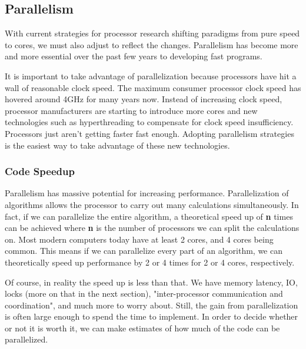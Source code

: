 \documentclass[letterpaper, 12pt]{article}
\begin{document}
\newpage

\subsection{Parallelism}
With current strategies for processor research shifting paradigms from pure speed to cores, 
we must also adjust to reflect the changes. Parallelism has become more and more essential 
over the past few years to developing fast programs.

\par\vspace{\baselineskip}

It is important to take advantage of parallelization because processors have hit a wall of 
reasonable clock speed\citep{processorspeed}. The maximum consumer processor clock speed has 
hovered around 4GHz for many years now. Instead of increasing clock speed, processor 
manufacturers are starting to introduce more cores and new technologies such as hyperthreading 
to compensate for clock speed insufficiency. Processors just aren't getting faster fast enough. 
Adopting parallelism strategies is the easiest way to take advantage of these new technologies.

\subsubsection{Code Speedup}
Parallelism has massive potential for increasing performance. Parallelization of algorithms 
allows the processor to carry out many calculations simultaneously. In fact, if we can 
parallelize the entire algorithm, a theoretical speed up of {\bfseries n} times can be 
achieved where {\bfseries n} is the number of processors we can split the calculations on. 
Most modern computers today have at least 2 cores, and 4 cores being common. This means 
if we can parallelize every part of an algorithm, we can theoretically speed up performance 
by 2 or 4 times for 2 or 4 cores, respectively. 

\par\vspace{\baselineskip}
Of course, in reality the speed up is less than that. We have memory latency, IO, locks 
(more on that in the next section), "inter-processor communication and coordination"\citep[p. 13]{artofmulti}, 
and much more to worry about. Still, the gain from parallelization is often large enough to spend 
the time to implement. In order to decide whether or not it is worth it, we can make estimates of 
how much of the code can be parallelized.
\end{document}
